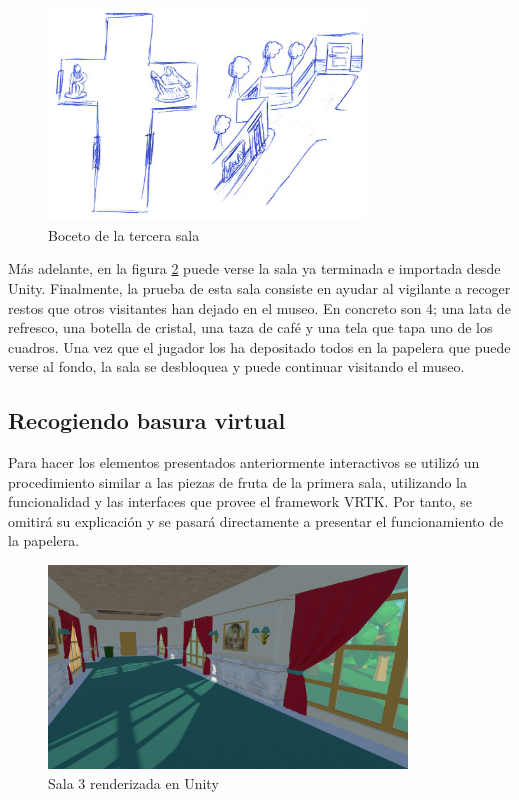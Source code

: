 \begin{figure}[!h]
\begin{center}
\includegraphics[width=0.75\textwidth]{imagenes/7/bocetos/boceto-sala-3.png}
\caption{Boceto de la tercera sala}
\label{fig:bocetos-sala-3}
\end{center}
\end{figure}

Más adelante, en la figura \ref{fig:unity-sala-3} puede verse la sala ya terminada e importada desde Unity. Finalmente, la prueba de esta sala consiste en ayudar al vigilante a recoger restos que otros visitantes han dejado en el museo. En concreto son 4; una lata de refresco, una botella de cristal, una taza de café y una tela que tapa uno de los cuadros. Una vez que el jugador los ha depositado todos en la papelera que puede verse al fondo, la sala se desbloquea y puede continuar visitando el museo.

\subsection{Recogiendo basura virtual}

Para hacer los elementos presentados anteriormente interactivos se utilizó un procedimiento similar a las piezas de fruta de la primera sala, utilizando la funcionalidad y las interfaces que provee el framework \acs{VRTK}. Por tanto, se omitirá su explicación y se pasará directamente a presentar el funcionamiento de la papelera.

\begin{figure}[!h]
\begin{center}
\includegraphics[width=0.85\textwidth]{imagenes/7/salas-unity/unity-sala-3.png}
\caption{Sala 3 renderizada en Unity}
\label{fig:unity-sala-3}
\end{center}
\end{figure}

